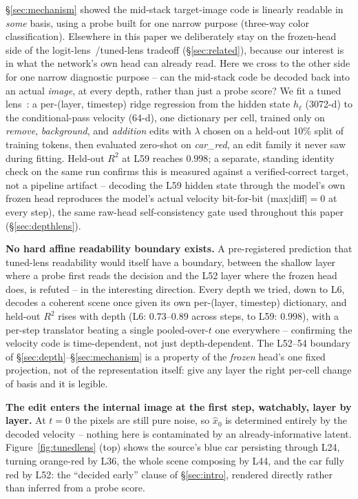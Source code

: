 \documentclass[10pt,twocolumn]{article}
\begin{document}
\S\ref{sec:mechanism} showed the mid-stack target-image code is
linearly readable in \emph{some} basis, using a probe built for one
narrow purpose (three-way color classification). Elsewhere in this
paper we deliberately stay on the frozen-head side of the
logit-lens~\citep{nostalgebraist2020logitlens}/tuned-lens tradeoff
(\S\ref{sec:related}), because our
interest is in what the network's own head can already read. Here we
cross to the other side for one narrow diagnostic purpose -- can the
mid-stack code be decoded back into an actual \emph{image}, at every
depth, rather than just a probe score? We fit a tuned
lens~\citep{belrose2023tuned}: a per-(layer, timestep) ridge
regression from the hidden state $h_\ell$ (3072-d) to the
conditional-pass velocity (64-d), one dictionary per cell, trained
only on \emph{remove}, \emph{background}, and \emph{addition} edits
with $\lambda$ chosen on a held-out 10\% split of training tokens,
then evaluated zero-shot on \emph{car\_red}, an edit family it never
saw during fitting. Held-out $R^2$ at L59 reaches $0.998$; a separate,
standing identity check on the same run confirms this is measured
against a verified-correct target, not a pipeline artifact --
decoding the L59 hidden state through the model's own frozen head
reproduces the model's actual velocity bit-for-bit
(max$|$diff$|=0$ at every step), the same raw-head self-consistency
gate used throughout this paper (\S\ref{sec:depthlens}).

\textbf{No hard affine readability boundary exists.} A pre-registered
prediction that tuned-lens readability would itself have a boundary,
between the shallow layer where a probe first reads the decision and
the L52 layer where the frozen head does, is refuted -- in the
interesting direction. Every depth we tried, down to L6, decodes a
coherent scene once given its own per-(layer, timestep) dictionary, and
held-out $R^2$ rises with depth (L6: $0.73$--$0.89$
across steps, to L59: $0.998$), with a per-step translator beating a
single pooled-over-$t$ one everywhere -- confirming the velocity code
is time-dependent, not just depth-dependent. The L52--54 boundary of
\S\ref{sec:depth}--\S\ref{sec:mechanism} is a property of the
\emph{frozen} head's one fixed projection, not of the representation
itself: give any layer the right per-cell change of basis and it is
legible.

\textbf{The edit enters the internal image at the first step,
watchably, layer by layer.} At $t{=}0$ the pixels are still pure
noise, so $\hat x_0$ is determined entirely by the decoded velocity --
nothing here is contaminated by an already-informative latent.
Figure~\ref{fig:tunedlens} (top) shows the source's blue car persisting
through L24, turning orange-red by L36, the whole scene composing by
L44, and the car fully red by L52: the ``decided early'' clause of
\S\ref{sec:intro}, rendered directly rather than inferred from a probe
score.
\end{document}
